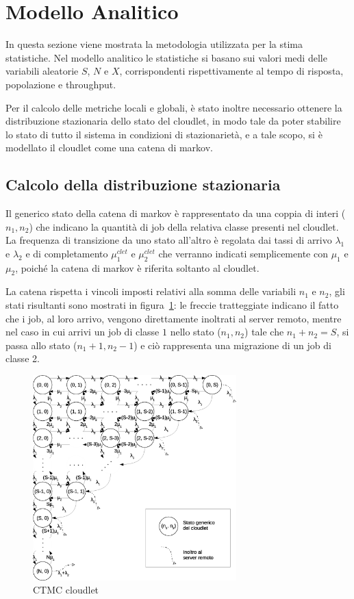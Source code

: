\section{Modello Analitico}
In questa sezione viene mostrata la metodologia utilizzata per la stima
statistiche.  Nel modello analitico le statistiche si basano sui valori medi
delle variabili aleatorie $S$, $N$ e $X$, corrispondenti rispettivamente al
tempo di risposta, popolazione e throughput.

Per il calcolo delle metriche locali e globali, è stato inoltre necessario
ottenere la distribuzione stazionaria dello stato del cloudlet, in modo tale da
poter stabilire lo stato di tutto il sistema in condizioni di stazionarietà, e a
tale scopo, si è modellato il cloudlet come una catena di markov.
%
\subsection{Calcolo della distribuzione stazionaria}
Il generico stato della catena di markov è rappresentato da una coppia di interi
($n_1, n_2$) che indicano la quantità di job della relativa classe presenti nel
cloudlet.\\
La frequenza di transizione da uno stato all'altro è regolata dai tassi di
arrivo $\lambda_1$ e $\lambda_2$ e di completamento $\mu_1^{clet}$ e
$\mu_2^{clet}$ che verranno indicati semplicemente con $\mu_1$ e $\mu_2$, poiché
la catena di markov è riferita soltanto al cloudlet.

La catena rispetta i vincoli imposti relativi alla somma delle variabili $n_1$ e
$n_2$, gli stati risultanti sono mostrati in figura~\ref{ctmc}: le freccie
tratteggiate indicano il fatto che i job, al loro arrivo, vengono direttamente
inoltrati al server remoto, mentre nel caso in cui arrivi un job di classe $1$
nello stato ($n_1, n_2$) tale che $n_1+n_2=S$, si passa allo stato ($n_1+1,
n_2-1$) e ciò rappresenta una migrazione di un job di classe 2.
%
\begin{figure}[!h]
\centering
\includegraphics[width=0.7\textwidth]{figures/ctmc}
\caption{CTMC cloudlet}
\label{ctmc}
\end{figure}
%

